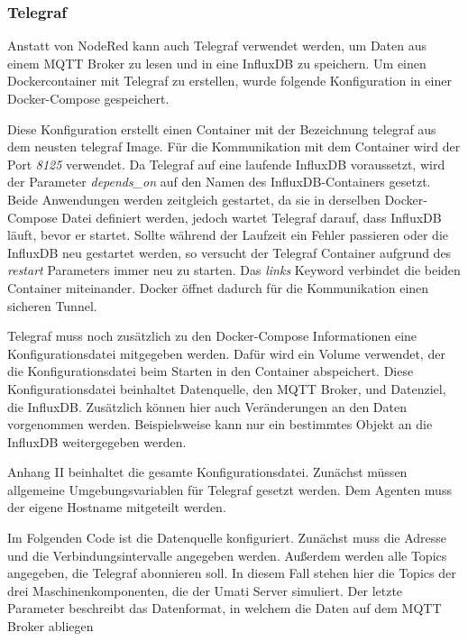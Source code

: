 \documentclass[a4paper, 12pt, oneside, toc=listofnumbered, bibliography=totoc]{scrbook}
\begin{document}
			\subsubsection{Telegraf}
			
			Anstatt von NodeRed kann auch Telegraf verwendet werden, um Daten aus einem MQTT Broker zu lesen und in eine InfluxDB zu speichern. Um einen Dockercontainer mit Telegraf zu erstellen, wurde folgende Konfiguration in einer Docker-Compose gespeichert.
			
			
			
			Diese Konfiguration erstellt einen Container mit der Bezeichnung telegraf aus dem neusten telegraf Image. Für die Kommunikation mit dem Container wird der Port \textit{8125} verwendet. Da Telegraf auf eine laufende InfluxDB voraussetzt, wird der Parameter \textit{depends\_on} auf den Namen des InfluxDB-Containers gesetzt. Beide Anwendungen werden zeitgleich gestartet, da sie in derselben Docker-Compose Datei definiert werden, jedoch wartet Telegraf darauf, dass InfluxDB läuft, bevor er startet. Sollte während der Laufzeit ein Fehler passieren oder die InfluxDB neu gestartet werden, so versucht der Telegraf Container aufgrund des \textit{restart} Parameters immer neu zu starten. Das \textit{links} Keyword verbindet die beiden Container miteinander. Docker öffnet dadurch für die Kommunikation einen sicheren Tunnel.
			
			Telegraf muss noch zusätzlich zu den Docker-Compose Informationen eine Konfigurationsdatei mitgegeben werden. Dafür wird ein Volume verwendet, der die Konfigurationsdatei beim Starten in den Container abspeichert. Diese Konfigurationsdatei beinhaltet Datenquelle, den MQTT Broker, und Datenziel, die InfluxDB. Zusätzlich können hier auch Veränderungen an den Daten vorgenommen werden. Beispielsweise kann nur ein bestimmtes Objekt an die InfluxDB weitergegeben werden. 
			
			Anhang II beinhaltet die gesamte Konfigurationsdatei. Zunächst müssen allgemeine Umgebungsvariablen für Telegraf gesetzt werden. Dem Agenten muss der eigene Hostname mitgeteilt werden. 
			
			
			
			Im Folgenden Code ist die Datenquelle konfiguriert. Zunächst muss die Adresse und die Verbindungsintervalle angegeben werden. Außerdem werden alle Topics angegeben, die Telegraf abonnieren soll. In diesem Fall stehen hier die Topics der drei Maschinenkomponenten, die der Umati Server simuliert. Der letzte Parameter beschreibt das Datenformat, in welchem die Daten auf dem MQTT Broker abliegen
			
\end{document}
